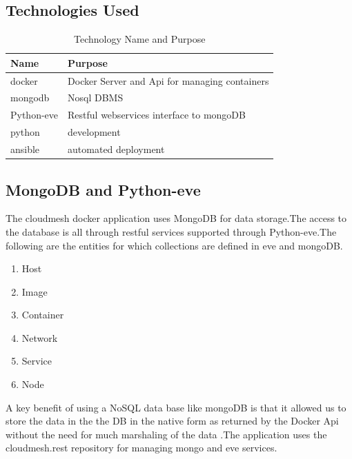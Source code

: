 \documentclass[9pt,twocolumn,twoside]{../../styles/osajnl}
\begin{document}
\subsection{Technologies Used}
\begin{table}[H]
\centering
\begin{tabular}{|l l|} 
 \hline
 Name & Purpose \\ 
 \hline
 docker \cite{www-Docker} & Docker Server and Api for managing containers \\ 
 mongodb \cite{www-MongoDB} & Nosql DBMS \\ 
 Python-eve    \cite{www-Pythoneve} & Restful webservices interface to mongoDB \\ 
 python \cite{www-Python} & development  \\ 
 ansible \cite{www-Ansible} & automated deployment \\ [1ex] 
\hline
\end{tabular}
\caption{Technology Name and Purpose}
\label{table:1}
\end{table}

\subsection{MongoDB and Python-eve}

The cloudmesh docker application uses MongoDB\cite{www-MongoDB} for data storage.The access to the database is all through
restful services supported through Python-eve\cite{www-Pythoneve}.The following are the entities for which collections are defined 
in eve and mongoDB.

\begin{enumerate}
\item Host
\item Image
\item Container
\item Network
\item Service
\item Node
\end{enumerate}
A key benefit of using a NoSQL data base like mongoDB is that it allowed us to store the data in the the DB in the native form as returned by the Docker Api without the need for much marshaling of the data .The application uses the cloudmesh.rest repository for managing mongo and eve services.
\end{document}
